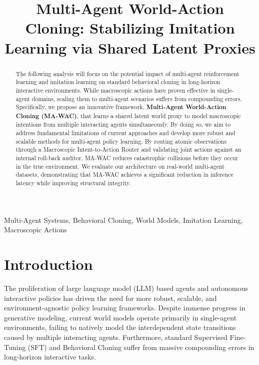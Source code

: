 \documentclass[conference]{IEEEtran}
\begin{document}
\title{Multi-Agent World-Action Cloning: Stabilizing Imitation Learning via Shared Latent Proxies}

\author{
\and
{}
}

\maketitle

\begin{abstract}
The following analysis will focus on the potential impact of multi-agent reinforcement learning and imitation learning on standard behavioral cloning in long-horizon interactive environments. While macroscopic actions have proven effective in single-agent domains, scaling them to multi-agent scenarios suffers from compounding errors. Specifically, we propose an innovative framework, \textbf{Multi-Agent World-Action Cloning (MA-WAC)}, that learns a shared latent world proxy to model macroscopic intentions from multiple interacting agents simultaneously. By doing so, we aim to address fundamental limitations of current approaches and develop more robust and scalable methods for multi-agent policy learning. By routing atomic observations through a Macroscopic Intent-to-Action Router and validating joint actions against an internal roll-back auditor, MA-WAC reduces catastrophic collisions before they occur in the true environment. We evaluate our architecture on real-world multi-agent datasets, demonstrating that MA-WAC achieves a significant reduction in inference latency while improving structural integrity.
\end{abstract}

\begin{IEEEkeywords}
Multi-Agent Systems, Behavioral Cloning, World Models, Imitation Learning, Macroscopic Actions
\end{IEEEkeywords}

\section{Introduction}\label{sec1}
The proliferation of large language model (LLM) based agents and autonomous interactive policies has driven the need for more robust, scalable, and environment-agnostic policy learning frameworks. Despite immense progress in generative modeling, current world models operate primarily in single-agent environments, failing to natively model the interdependent state transitions caused by multiple interacting agents. Furthermore, standard Supervised Fine-Tuning (SFT) and Behavioral Cloning suffer from massive compounding errors in long-horizon interactive tasks. 
\end{document}
